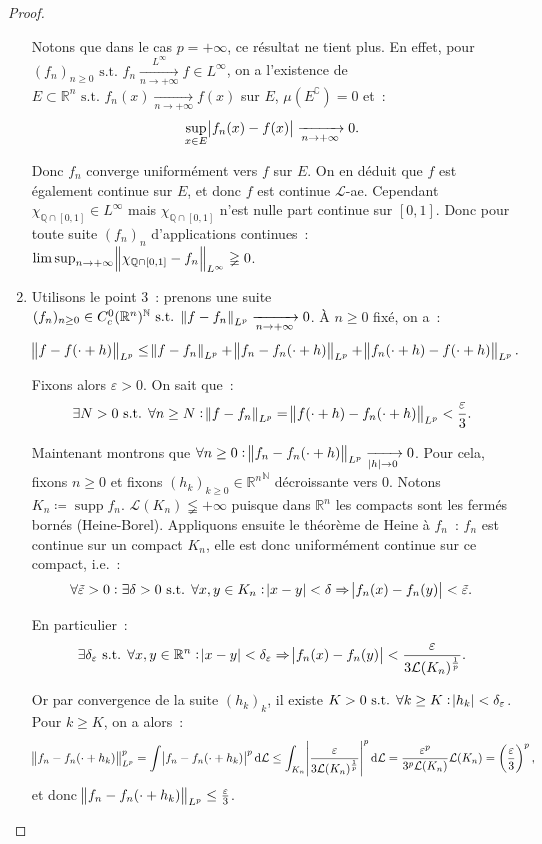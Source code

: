 \documentclass{article}
\newcommand{\pinfty}{{+\infty}}
\newcommand{\st}{\text{ s.t. }}
\newcommand{\C}{\complement}
\newcommand{\N}{{\mathbb N}}
\newcommand{\Q}{{\mathbb Q}}
\newcommand{\R}{{\mathbb R}}
\DeclareMathOperator{\supp}{supp}
\begin{document}
\begin{proof}
\begin{enumerate}
	Notons que dans le cas $p = \pinfty$, ce résultat ne tient plus. En effet, pour $(f_n)_{n \geq 0} \st f_n \xrightarrow[n \to \pinfty]{L^\infty} f \in L^\infty$, on a
	l'existence de $E \subset \R^n \st f_n(x) \xrightarrow[n \to \pinfty]{} f(x)$ sur $E$, $\mu(E^\C) = 0$ et~:
	\[\sup_{x \in E}\abs {f_n(x)-f(x)} \xrightarrow[n \to \pinfty]{} 0.\]

	Donc $f_n$ converge uniformément vers $f$ sur $E$. On en déduit que $f$ est également continue sur $E$, et donc $f$ est continue $\mathcal L$-ae. Cependant
	$\chi_{\Q \cap [0, 1]} \in L^\infty$ mais $\chi_{\Q \cap [0, 1]}$ n'est nulle part continue sur $[0, 1]$. Donc pour toute suite $(f_n)_n$ d'applications continues~:
	$\limsup_{n \to \pinfty}\norm {\chi_{\Q \cap [0, 1]}-f_n}_{L^\infty} \gneqq 0$.

	\item Utilisons le point 3~: prenons une suite $(f_n)_{n \geq 0} \in C_c^0(\R^n)^\N \st \norm {f-f_n}_{L^p} \xrightarrow[n \to \pinfty]{} 0$. À $n \geq 0$ fixé, on a~:
	\[\norm {f-f(\cdot+h)}_{L^p} \leq \norm {f-f_n}_{L^p} + \norm {f_n-f_n(\cdot + h)}_{L^p} + \norm {f_n(\cdot+h)-f(\cdot+h)}_{L^p}.\]

	Fixons alors $\varepsilon > 0$. On sait que~:
	\[\exists N > 0 \st \forall n \geq N : \norm {f-f_n}_{L^p} = \norm {f(\cdot+h)-f_n(\cdot+h)}_{L^p} < \frac \varepsilon3.\]

	Maintenant montrons que $\forall n \geq 0 : \norm {f_n-f_n(\cdot+h)}_{L^p} \xrightarrow[\abs h \to 0]{} 0$. Pour cela, fixons $n \geq 0$ et fixons
	$(h_k)_{k \geq 0} \in {\R^n}^\N$ décroissante vers $0$. Notons $K_n \coloneqq \supp f_n$. $\mathcal L(K_n) \lneqq \pinfty$ puisque dans $\R^n$ les compacts sont les fermés bornés
	(Heine-Borel). Appliquons ensuite le théorème de Heine à $f_n$~: $f_n$ est continue sur un compact $K_n$, elle est donc uniformément continue sur ce compact, i.e.~:
	\[\forall \tilde \varepsilon > 0 : \exists \delta > 0 \st \forall x, y \in K_n : \abs {x-y} < \delta \Rightarrow \abs {f_n(x)-f_n(y)} < \tilde \varepsilon.\]

	En particulier~:
	\[\exists \delta_\varepsilon \st \forall x, y \in \R^n : \abs {x-y} < \delta_\varepsilon \Rightarrow \abs {f_n(x)-f_n(y)} < \frac {\varepsilon}{3\mathcal L(K_n)^{\frac 1p}}.\]

	Or par convergence de la suite $(h_k)_k$, il existe $K > 0 \st \forall k \geq K : \abs {h_k} < \delta_\varepsilon$. Pour $k \geq K$, on a alors~:
	\[\norm {f_n-f_n(\cdot+h_k)}_{L^p}^p = \int\abs {f_n-f_n(\cdot+h_k)}^p\dif\mathcal L \leq \int_{K_n}\abs {\frac {\varepsilon}{3\mathcal L(K_n)^{\frac 1p}}}^p\dif\mathcal L
		= \frac {\varepsilon^p}{3^p\mathcal L(K_n)}\mathcal L(K_n) = \left(\frac \varepsilon3\right)^p,\]
	et donc $\norm {f_n-f_n(\cdot+h_k)}_{L^p} \leq \frac \varepsilon3$.


\end{enumerate}
\end{proof}
\end{document}
